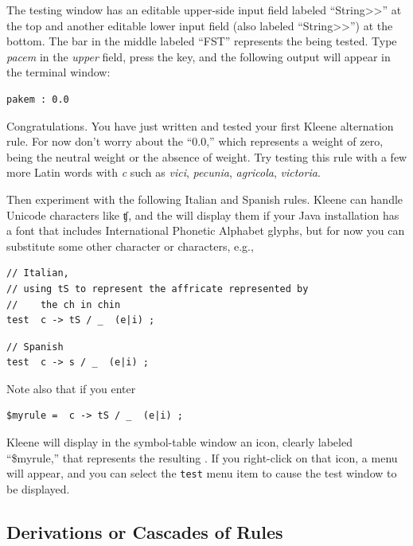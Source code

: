 The testing window has an editable upper-side input field labeled
\mbox{``String>\hspace{0pt}>''} at the top and another editable lower input field (also
labeled \mbox{``String>\hspace{0pt}>''}) at the bottom.  The
bar in the middle labeled ``FST'' represents the \fst{} being tested.  Type \emph{pacem} in the \emph{upper} field,
press the  key, and the following output will appear in the  terminal window:


\begin{Verbatim}
pakem : 0.0
\end{Verbatim}

\noindent
Congratulations.  You have just written
and tested your first Kleene alternation rule.  For now don't worry about the ``0.0,'' which
represents a weight of zero, being the neutral weight
or the absence of weight.    Try testing this rule with a few more Latin words with \emph{c} such as
\emph{vici}, \emph{pecunia},
\emph{agricola}, \emph{victoria}.

Then experiment with the following Italian and Spanish rules.  Kleene can handle Unicode characters
like ʧ, and the  will display them if your Java installation has a font
that includes International Phonetic Alphabet glyphs, but for now you
can substitute some other character or characters, e.g.,


\begin{Verbatim}
// Italian, 
// using tS to represent the affricate represented by 
//    the ch in chin
test  c -> tS / _  (e|i) ;
\end{Verbatim}

\begin{Verbatim}
// Spanish
test  c -> s / _  (e|i) ;
\end{Verbatim}


\noindent
Note also that if you enter

\begin{Verbatim}
$myrule =  c -> tS / _  (e|i) ;
\end{Verbatim}

\noindent
Kleene will display in the symbol-table window an icon, clearly labeled ``\$myrule,'' that represents the resulting
\fst{}.  If you right-click on that icon, a menu will appear, and you can select the \texttt{test} menu item to
cause the test window to be displayed.

\subsection{Derivations or Cascades of Rules}

